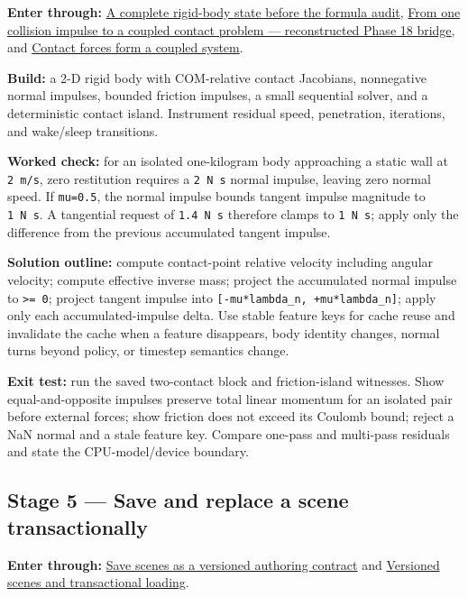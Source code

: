 \textbf{Enter through:} \hyperref[06-engine-ii-ch035]{A complete rigid-body state before the formula audit}, \hyperref[06-engine-ii-ch040]{From one collision impulse to a coupled contact problem --- reconstructed Phase 18 bridge}, and \hyperref[06-engine-ii-ch046]{Contact forces form a coupled system}.

\textbf{Build:} a 2-D rigid body with COM-relative contact Jacobians, nonnegative normal impulses, bounded friction impulses, a small sequential solver, and a deterministic contact island. Instrument residual speed, penetration, iterations, and wake/sleep transitions.

\textbf{Worked check:} for an isolated one-kilogram body approaching a static wall at \texttt{2\ m/s}, zero restitution requires a \texttt{2\ N\ s} normal impulse, leaving zero normal speed. If \texttt{mu=0.5}, the normal impulse bounds tangent impulse magnitude to \texttt{1\ N\ s}. A tangential request of \texttt{1.4\ N\ s} therefore clamps to \texttt{1\ N\ s}; apply only the difference from the previous accumulated tangent impulse.

\textbf{Solution outline:} compute contact-point relative velocity including angular velocity; compute effective inverse mass; project the accumulated normal impulse to \texttt{\textgreater{}=\ 0}; project tangent impulse into \texttt{{[}-mu*lambda\_n,\ +mu*lambda\_n{]}}; apply only each accumulated-impulse delta. Use stable feature keys for cache reuse and invalidate the cache when a feature disappears, body identity changes, normal turns beyond policy, or timestep semantics change.

\textbf{Exit test:} run the saved two-contact block and friction-island witnesses. Show equal-and-opposite impulses preserve total linear momentum for an isolated pair before external forces; show friction does not exceed its Coulomb bound; reject a NaN normal and a stale feature key. Compare one-pass and multi-pass residuals and state the CPU-model/device boundary.

\subsection{Stage 5 --- Save and replace a scene transactionally}\label{stage-5-save-and-replace-a-scene-transactionally}

\textbf{Enter through:} \hyperref[06-engine-ii-ch033]{Save scenes as a versioned authoring contract} and \hyperref[06-engine-ii-ch033]{Versioned scenes and transactional loading}.

